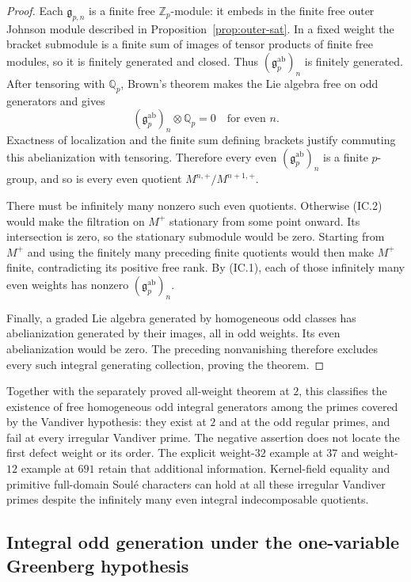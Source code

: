 \documentclass[11pt,a4paper]{article}
\theoremstyle{definition}
\begin{document}
\begin{proof}
Each $\mathfrak g_{p,n}$ is a finite free $\mathbb Z_p$-module:
it embeds in the finite free outer Johnson module described in
Proposition~\ref{prop:outer-sat}.  In a fixed weight the bracket
submodule is a finite sum of images of tensor products of finite
free modules, so it is finitely generated and closed.  Thus
$(\mathfrak g_p^{\mathrm{ab}})_n$ is finitely generated.
After tensoring with $\mathbb Q_p$, Brown's theorem makes the
Lie algebra free on odd generators and gives
\[
 (\mathfrak g_p^{\mathrm{ab}})_n\otimes\mathbb Q_p=0
 \quad\text{for even }n.
\]
Exactness of localization and the finite sum defining brackets
justify commuting this abelianization with tensoring.
Therefore every even $(\mathfrak g_p^{\mathrm{ab}})_n$ is a
finite $p$-group, and so is every even quotient
$M^{n,+}/M^{n+1,+}$.

There must be infinitely many nonzero such even quotients.
Otherwise (IC.2) would make the filtration on $M^+$ stationary
from some point onward.  Its intersection is zero, so the
stationary submodule would be zero.  Starting from $M^+$ and
using the finitely many preceding finite quotients would then
make $M^+$ finite, contradicting its positive free rank.
By (IC.1), each of those infinitely many even weights has
nonzero $(\mathfrak g_p^{\mathrm{ab}})_n$.

Finally, a graded Lie algebra generated by homogeneous odd
classes has abelianization generated by their images, all in odd
weights.  Its even abelianization would be zero.  The preceding
nonvanishing therefore excludes every such integral generating
collection, proving the theorem.
\end{proof}

Together with the separately proved all-weight theorem at $2$,
this classifies the existence of free homogeneous odd integral
generators among the primes covered by the Vandiver hypothesis:
they exist at $2$ and at the odd regular primes, and fail at every
irregular Vandiver prime.  The negative assertion does not locate
the first defect weight or its order.  The explicit weight-$32$
example at $37$ and weight-$12$ example at $691$ retain that
additional information.  Kernel-field equality and primitive
full-domain Soul\'e characters can hold at all these irregular
Vandiver primes despite the infinitely many even integral
indecomposable quotients.

\subsection{Integral odd generation under the one-variable Greenberg hypothesis}
\label{sec:greenberg-integral}
\end{document}
